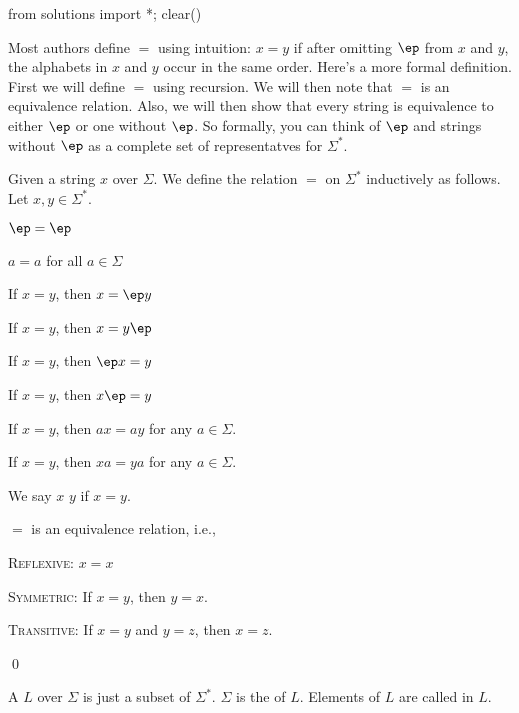 \begin{python0}
from solutions import *; clear()
\end{python0}

Most authors define $=$ using intuition: $x=y$ if after omitting
$\ep$ from $x$ and $y$, the alphabets in $x$ and $y$ occur in the
same order. Here's a more formal definition. First we will define
$=$ using recursion. We will then note that $=$ is an equivalence
relation. Also, we will then show that every string is equivalence
to either $\ep$ or one without $\ep$. So formally, you can think of
$\ep$ and strings without $\ep$ as a complete set of representatves
for $\Sigma^*$.

\begin{defn}
Given a string $x$ over $\Sigma$. We define the relation $=$ on
$\Sigma^*$ inductively as follows.
Let $x, y \in \Sigma^*$.
\begin{myenum}
\item  $\ep = \ep$
\item  $a = a$ for all $a \in \Sigma$
\item  If $x = y$, then $x = \ep y$
\item  If $x = y$, then $x = y \ep$
\item  If $x = y$, then $\ep x = y$
\item  If $x = y$, then $x \ep = y$
\item  If $x = y$, then $ax = ay$ for any $a \in \Sigma$.
\item  If $x = y$, then $xa = ya$ for any $a \in \Sigma$.
\end{myenum}
We say $x$  $y$
if $x=y$.
\end{defn}




\begin{prop}
$=$ is an equivalence relation, i.e.,
\begin{myenum}
\item \textsc{Reflexive:} $x = x$
\item \textsc{Symmetric:} If $x = y$, then $y = x$.
\item \textsc{Transitive:} If $x = y$ and $y = z$, then $x = z$.
\end{myenum}
\qed
\end{prop}



\begin{defn}
  A
  $L$ over $\Sigma$ is just a subset of $\Sigma^*$.
  $\Sigma$ is the
  of $L$.
  Elements of $L$ are called
  \sidebarskip{12pt}
  in $L$.
\end{defn}
